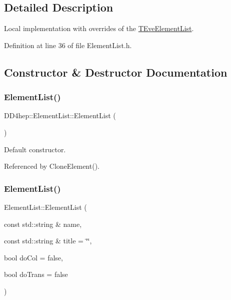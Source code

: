 \subsection{Detailed Description}
Local implementation with overrides of the \hyperlink{class_t_eve_element_list}{T\+Eve\+Element\+List}. 

Definition at line 36 of file Element\+List.\+h.



\subsection{Constructor \& Destructor Documentation}
\hypertarget{class_d_d4hep_1_1_element_list_add023eff52a3dc205c33891c200cace1}{}\label{class_d_d4hep_1_1_element_list_add023eff52a3dc205c33891c200cace1} 
\subsubsection{\texorpdfstring{Element\+List()}{ElementList()}\hspace{0.1cm}{\footnotesize\ttfamily [1/3]}}
{\footnotesize\ttfamily D\+D4hep\+::\+Element\+List\+::\+Element\+List (\begin{DoxyParamCaption}{ }\end{DoxyParamCaption})}



Default constructor. 



Referenced by Clone\+Element().

\hypertarget{class_d_d4hep_1_1_element_list_a9ac013ec9cc0b96d6c31e19401765833}{}\label{class_d_d4hep_1_1_element_list_a9ac013ec9cc0b96d6c31e19401765833} 
\subsubsection{\texorpdfstring{Element\+List()}{ElementList()}\hspace{0.1cm}{\footnotesize\ttfamily [2/3]}}
{\footnotesize\ttfamily Element\+List\+::\+Element\+List (\begin{DoxyParamCaption}\item[{const std\+::string \&}]{name,  }\item[{const std\+::string \&}]{title = {\ttfamily \char`\"{}\char`\"{}},  }\item[{bool}]{do\+Col = {\ttfamily false},  }\item[{bool}]{do\+Trans = {\ttfamily false} }\end{DoxyParamCaption})}



